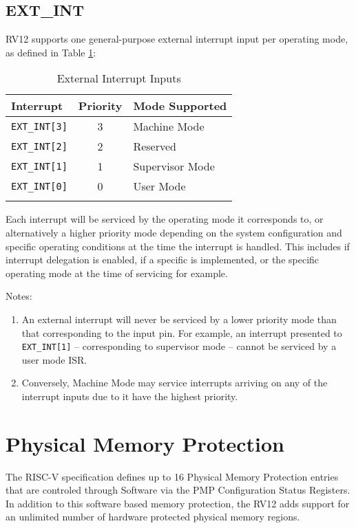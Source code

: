 \subsection{EXT\_INT}\label{ext_int}

RV12 supports one general-purpose external interrupt input per operating
mode, as defined in Table \ref{tab:external-interrupt-inputs}:

\begin{longtable}[]{@{}lcl@{}}
\toprule
Interrupt & Priority & Mode Supported\tabularnewline
\midrule
\endhead
\texttt{EXT\_INT{[}3{]}} & 3 & Machine Mode\tabularnewline
\texttt{EXT\_INT{[}2{]}} & 2 & Reserved\tabularnewline
\texttt{EXT\_INT{[}1{]}} & 1 & Supervisor Mode\tabularnewline
\texttt{EXT\_INT{[}0{]}} & 0 & User Mode\tabularnewline
\bottomrule
\caption{External Interrupt Inputs}
\label{tab:external-interrupt-inputs}
\end{longtable}

Each interrupt will be serviced by the operating mode it corresponds to,
or alternatively a higher priority mode depending on the system
configuration and specific operating conditions at the time the
interrupt is handled. This includes if interrupt delegation is enabled,
if a specific is implemented, or the specific operating mode at the time
of servicing for example.

Notes:

\begin{enumerate}
\def\labelenumi{\arabic{enumi}.}
\item
  An external interrupt will never be serviced by a lower priority mode
  than that corresponding to the input pin. For example, an interrupt
  presented to \texttt{EXT\_INT{[}1{]}} -- corresponding to supervisor mode --
  cannot be serviced by a user mode ISR.
\item
  Conversely, Machine Mode may service interrupts arriving on any of the
  interrupt inputs due to it have the highest priority.
\end{enumerate}

\section{Physical Memory Protection}\label{phys_mem_protection}

The RISC-V specification defines up to 16 Physical Memory Protection entries that are controled through Software via the PMP Configuration Status Registers. In addition to this software based memory protection, the RV12 adds support for an unlimited number of hardware protected physical memory regions.

